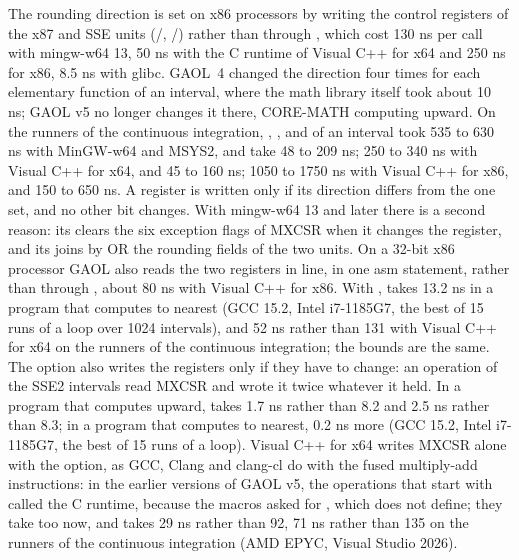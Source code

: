 \medskip
The rounding direction is set on x86 processors by writing the control
registers of the x87 and SSE units (/,
/) rather than through ,
which cost 130 ns per call with mingw-w64 13, 50 ns with the C runtime of
Visual C++ for x64 and 250 ns for x86, 8.5 ns with glibc.\newinvfive{} GAOL~4
changed the direction four times for each elementary function of an interval,
where the math library itself took about 10 ns; GAOL v5 no longer changes it
there, CORE-MATH computing upward. On the runners of the continuous
integration, , ,  and  of an
interval took 535 to 630 ns with MinGW-w64 and MSYS2, and take 48 to 209 ns;
250 to 340 ns with Visual C++ for x64, and 45 to 160 ns; 1050 to 1750 ns with
Visual C++ for x86, and 150 to 650 ns. A register is written only if its
direction differs from the one set, and no other bit changes. With mingw-w64
13 and later there is a second reason: its  clears the six
exception flags of MXCSR when it changes the register, and its
 joins by OR the rounding fields of the two units. On a
32-bit x86 processor GAOL also reads the two registers in line, in one asm
statement, rather than through , about 80 ns with Visual
C++ for x86. With ,  takes 13.2 ns in a program that computes to nearest (GCC 15.2, Intel i7-1185G7, the best of 15 runs of a loop over 1024 intervals), and 52 ns rather than 131 with Visual C++ for x64 on the runners of the continuous integration;
the bounds are the same. The option also writes the registers only if they
have to change: an operation of the SSE2 intervals read MXCSR and wrote it
twice whatever it held. In a program that computes upward, 
takes 1.7 ns rather than 8.2 and  2.5 ns rather than 8.3; in a
program that computes to nearest, 0.2 ns more (GCC 15.2, Intel i7-1185G7, the
best of 15 runs of a loop). Visual C++ for x64 writes MXCSR alone with the
option, as GCC, Clang and clang-cl do with the fused multiply-add
instructions: in the earlier versions of GAOL v5, the operations that start
with  called the C runtime, because the macros asked for , which
 does not define; they take  too now, and
 takes 29 ns rather than 92,  71 ns rather than
135 on the runners of the continuous integration (AMD EPYC, Visual Studio
2026).

